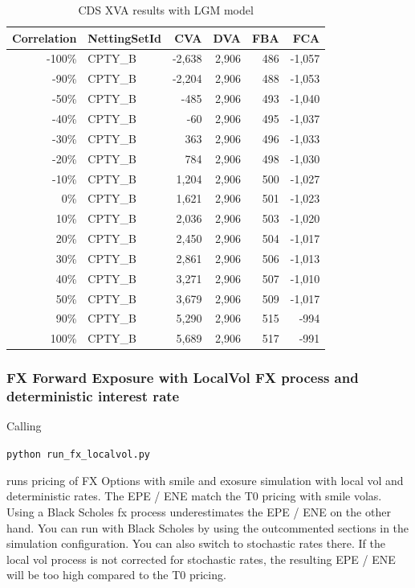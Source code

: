 \begin{table}[hbt]
\scriptsize
\begin{center}
\begin{tabular}{|r|l|r|r|r|r|}
\hline
Correlation & NettingSetId & CVA & DVA & FBA & FCA \\
\hline
-100\%  &  CPTY\_B  &  -2,638  &  2,906  &  486  &  -1,057 \\
 -90\%  &  CPTY\_B  &  -2,204  &  2,906  &  488  &  -1,053 \\
 -50\%  &  CPTY\_B  &    -485  &  2,906  &  493  &  -1,040 \\
 -40\%  &  CPTY\_B  &     -60  &  2,906  &  495  &  -1,037 \\
 -30\%  &  CPTY\_B  &     363  &  2,906  &  496  &  -1,033 \\
 -20\%  &  CPTY\_B  &     784  &  2,906  &  498  &  -1,030 \\
 -10\%  &  CPTY\_B  &   1,204  &  2,906  &  500  &  -1,027 \\
   0\%  &  CPTY\_B  &   1,621  &  2,906  &  501  &  -1,023 \\
  10\%  &  CPTY\_B  &   2,036  &  2,906  &  503  &  -1,020 \\
  20\%  &  CPTY\_B  &   2,450  &  2,906  &  504  &  -1,017 \\
  30\%  &  CPTY\_B  &   2,861  &  2,906  &  506  &  -1,013 \\
  40\%  &  CPTY\_B  &   3,271  &  2,906  &  507  &  -1,010 \\
  50\%  &  CPTY\_B  &   3,679  &  2,906  &  509  &  -1,017 \\
  90\%  &  CPTY\_B  &   5,290  &  2,906  &  515  &    -994 \\
 100\%  &  CPTY\_B  &   5,689  &  2,906  &  517  &    -991 \\
\hline
\end{tabular}
\caption{CDS XVA results with LGM model}
\end{center}
\end{table}

\subsubsection{FX Forward Exposure with LocalVol FX process and deterministic interest rate}\label{example:fx_localvol_detrates}

Calling

\medskip
\centerline{\tt python run\_fx\_localvol.py }
\medskip

runs pricing of FX Options with smile and exosure simulation with local vol and deterministic rates. The EPE / ENE match
the T0 pricing with smile volas. Using a Black Scholes fx process underestimates the EPE / ENE on the other hand. You
can run with Black Scholes by using the outcommented sections in the simulation configuration. You can also switch to
stochastic rates there. If the local vol process is not corrected for stochastic rates, the resulting EPE / ENE will be
too high compared to the T0 pricing.

